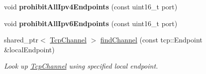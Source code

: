 \begin{DoxyCompactItemize}
\item 
void {\bfseries prohibit\+All\+Ipv4\+Endpoints} (const uint16\+\_\+t port)\hypertarget{classnfd_1_1TcpFactory_a13aa7294e91c9cb565ac41ba643ffd07}{}\label{classnfd_1_1TcpFactory_a13aa7294e91c9cb565ac41ba643ffd07}

\item 
void {\bfseries prohibit\+All\+Ipv6\+Endpoints} (const uint16\+\_\+t port)\hypertarget{classnfd_1_1TcpFactory_a06191fa4b81d6abca0995155c74349ea}{}\label{classnfd_1_1TcpFactory_a06191fa4b81d6abca0995155c74349ea}

\item 
shared\+\_\+ptr$<$ \hyperlink{classnfd_1_1TcpChannel}{Tcp\+Channel} $>$ \hyperlink{classnfd_1_1TcpFactory_a214d6667fc97b165c241130d2510cd1c}{find\+Channel} (const tcp\+::\+Endpoint \&local\+Endpoint)
\begin{DoxyCompactList}\small\item\em Look up \hyperlink{classnfd_1_1TcpChannel}{Tcp\+Channel} using specified local endpoint. \end{DoxyCompactList}\end{DoxyCompactItemize}

